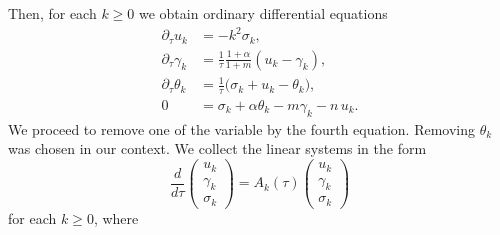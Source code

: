 \documentclass[a4paper,11pt]{article}
\theoremstyle{remark}
\begin{document}
Then, for each $k\ge0$ we obtain ordinary differential equations
\begin{equation} \label{eq:l-system}
 \begin{aligned}
  \partial_\tau u_k &= -k^2 \sigma_k,\\
  \partial_\tau\gamma_k &= \frac{1}{\tau}\frac{1+\alpha}{1+m}(u_k-\gamma_k),\\
  \partial_\tau\theta_k &= \frac{1}{\tau}\Big(\sigma_k+ u_k -\theta_k\Big),\\%
  0&=\sigma_k + \alpha\theta_k -m\gamma_k - n \, u_k .
 \end{aligned}
\end{equation}
We proceed to remove one of the variable by the fourth equation. Removing $\theta_k$ was chosen in our context. We collect the linear systems in the form
\begin{equation}\label{eq:l-system2} \tag{$L_k$}
 \frac{d}{d\tau}\begin{pmatrix} u_k\\ \gamma_k \\ \sigma_k \end{pmatrix}
 = A_k(\tau) \begin{pmatrix} u_k\\ \gamma_k \\ \sigma_k \end{pmatrix}
\end{equation}
for each $k\ge0$, where
\end{document}
